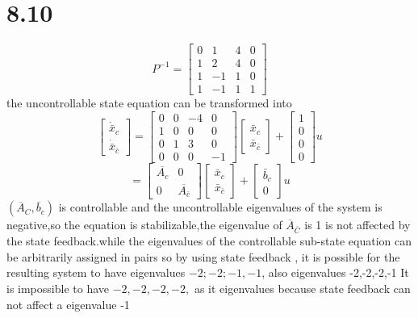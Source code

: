 \documentclass{article}
\begin{document}
\section*{8.10}
$$
P^{-1}=\left[\begin{array}{cccc}
0 & 1 & 4 & 0 \\
1 & 2 & 4 & 0 \\
1 & -1 & 1 & 0 \\
1 & -1 & 1 & 1
\end{array}\right]
$$
the uncontrollable state equation can be transformed into 
$$
\left[\begin{array}{c}
\dot{\bar{x}}_{c} \\
\dot{\bar{x}}_{\bar{c}}
\end{array}\right]=\left[\begin{array}{cccc}
0 & 0 & -4 & 0 \\
1 & 0 & 0 & 0 \\
0 & 1 & 3 & 0 \\
0 & 0 & 0 & -1
\end{array}\right]
\left[
    \begin{split}\bar{x}_{c}\\
        \bar{x}_{\bar{c}}
    \end{split}\right]+\left[\begin{array}{l}
1 \\
0 \\
0 \\
0
\end{array}\right] u
$$
$$
=\left[\begin{array}{cc}
\overline{A_{c}} & 0 \\
0 & \overline{A_{\bar{c}}}
\end{array}\right]\left[
    \begin{split}\bar{x}_{c}\\
        \bar{x}_{\bar{c}}
    \end{split}\right]+\left[
        \begin{split}\bar{b}_{c}\\
            0
        \end{split}\right] u
$$
$\left(\overline{A}_{C}, \bar{b}_{c}\right)$ is controllable and the uncontrollable eigenvalues of the system is negative,so the equation is stabilizable,the eigenvalue of
$\overline{A}_{\bar{C}}$ is 1 is not affected by the state feedback.while the eigenvalues of the controllable
sub-state equation can be arbitrarily assigned in pairs so by using state feedback , it is possible for the resulting system to have eigenvalues $-2 ;-2 ;-1,-1$, also eigenvalues -2,-2,-2,-1 It is impossible to have $-2,-2,-2,-2,$ as it eigenvalues because state feedback can not affect a eigenvalue -1
\end{document}
